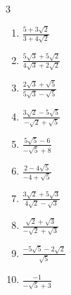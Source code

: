 \begin{multicols}{3}
\begin{enumerate}

  \item $\displaystyle \frac{5+3\sqrt{2}}{3+4\sqrt{2}}$


\columnbreak %

\resetques

  \item $\displaystyle \frac{5\sqrt{3}+5\sqrt{2}}{4\sqrt{3}+2\sqrt{2}}$


  \item $\displaystyle \frac{2\sqrt{3}+\sqrt{5}}{5\sqrt{3}-\sqrt{5}}$


  \item $\displaystyle \frac{3\sqrt{2}-5\sqrt{5}}{-\sqrt{2}+\sqrt{5}}$


  \item $\displaystyle \frac{5\sqrt{5}-6}{-\sqrt{5}+8}$


  \item $\displaystyle \frac{2-4\sqrt{5}}{-4+\sqrt{5}}$


\columnbreak %

  \item $\displaystyle \frac{3\sqrt{2}+5\sqrt{3}}{4\sqrt{2}-\sqrt{3}}$


  \item $\displaystyle \frac{\sqrt{2}+\sqrt{3}}{-\sqrt{2}+\sqrt{3}}$


  \item $\displaystyle \frac{-5\sqrt{5}-2\sqrt{2}}{\sqrt{5}}$


  \item $\displaystyle \frac{-1}{-\sqrt{5}+3}$


\end{enumerate}
\end{multicols}
